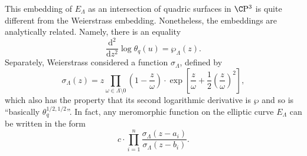 \begin{remark}\label{EllipticFunctionsHaveWeierstrassPresentation}
This embedding of \(E_\Lambda\) as an intersection of quadric surfaces in \(\CP^3\) is quite different from the Weierstrass embedding.  Nonetheless, the embeddings are analytically related.  Namely, there is an equality \[\frac{\mathrm d^2}{\mathrm dz^2} \log \theta_q(u) = \wp_\Lambda(z).\]  Separately, Weierstrass considered a function \(\sigma_\Lambda\), defined by \[\sigma_\Lambda(z) = z \prod_{\omega \in \Lambda \setminus 0} \left( 1 - \frac{z}{\omega} \right) \cdot \exp \left[ \frac{z}{\omega} + \frac{1}{2} \left( \frac{z}{\omega} \right)^2 \right],\] which also has the property that its second logarithmic derivative is \(\wp\) and so is ``basically \(\theta_q^{1/2,1/2}\)''.  In fact, any meromorphic function on the elliptic curve $E_\Lambda$ can be written in the form \[c \cdot \prod_{i=1}^n \frac{\sigma_\Lambda(z - a_i)}{\sigma_\Lambda(z - b_i)}.\]
\end{remark}

